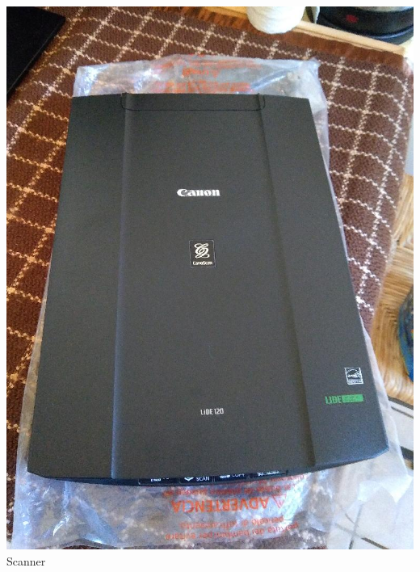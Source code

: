\documentclass[t]{beamer}
\newcommand{\htarget}[2]{\hypertarget{#1}{#2}}
\begin{document}
\begin{frame}\htarget{scanner}{} \begin{center}
\includegraphics[height=0.8\textheight]{scanner_mini.jpg} \\
Scanner
\end{center} \end{frame}
\end{document}
